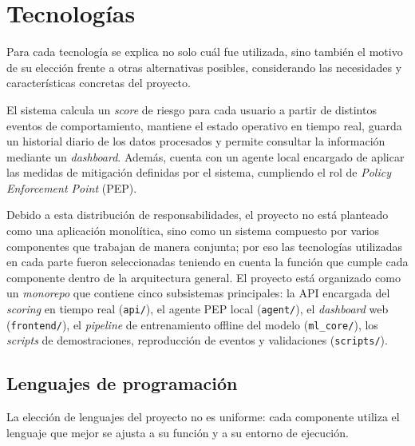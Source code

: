 \clearpage
\chapter{Tecnologías}
\label{sec:tecnologias}
Para cada tecnología se explica no solo cuál fue utilizada, sino también el motivo de su elección frente a otras alternativas posibles, considerando las necesidades y características concretas del proyecto.

El sistema calcula un \emph{score} de riesgo para cada usuario a partir de distintos eventos de comportamiento, mantiene el estado operativo en tiempo real, guarda un historial diario de los datos procesados y permite consultar la información mediante un \emph{dashboard}. Además, cuenta con un agente local encargado de aplicar las medidas de mitigación definidas por el sistema, cumpliendo el rol de \emph{Policy Enforcement Point} (PEP).

Debido a esta distribución de responsabilidades, el proyecto no está planteado como una aplicación monolítica, sino como un sistema compuesto por varios componentes que trabajan de manera conjunta; por eso las tecnologías utilizadas en cada parte fueron seleccionadas teniendo en cuenta la función que cumple cada componente dentro de la arquitectura general. El proyecto está organizado como un \emph{monorepo} que contiene cinco subsistemas principales: la API encargada del \emph{scoring} en tiempo real (\texttt{api/}), el agente PEP local (\texttt{agent/}), el \emph{dashboard} web (\texttt{frontend/}), el \emph{pipeline} de entrenamiento offline del modelo (\texttt{ml\_core/}), los \emph{scripts} de demostraciones, reproducción de eventos y validaciones (\texttt{scripts/}).

\section{Lenguajes de programación}
La elección de lenguajes del proyecto no es uniforme: cada componente utiliza el lenguaje que mejor se ajusta a su función y a su entorno de ejecución.

